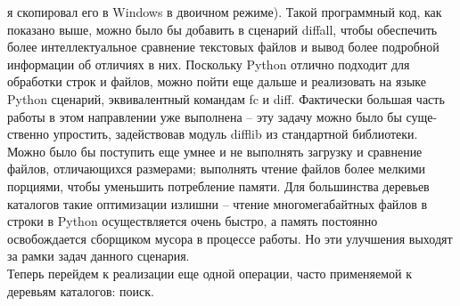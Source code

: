 \documentclass[12pt]{article}
\begin{document}
я скопировал его в Windows в двоичном режиме). Такой программный
код, как показано выше, можно было бы добавить в сценарий diffall,
чтобы обеспечить более интеллектуальное сравнение текстовых файлов
и вывод более подробной информации об отличиях в них.
Поскольку Python отлично подходит для обработки строк и файлов,
можно пойти еще дальше и реализовать на языке Python сценарий,
эквивалентный командам fc и diff. Фактически большая часть работы
в этом направлении уже выполнена – эту задачу можно было бы суще-
ственно упростить, задействовав модуль difflib из стандартной библиотеки.
Можно было бы поступить еще умнее и не выполнять загрузку и сравнение файлов, отличающихся размерами; выполнять чтение файлов
более мелкими порциями, чтобы уменьшить потребление памяти.
Для большинства деревьев каталогов такие оптимизации излишни –
чтение многомегабайтных файлов в строки в Python осуществляется
очень быстро, а память постоянно освобождается сборщиком мусора
в процессе работы.
Но эти улучшения выходят за рамки задач данного сценария. \\
Теперь перейдем к реализации еще одной операции, часто применяемой к деревьям
каталогов: поиск.
\end{document}

